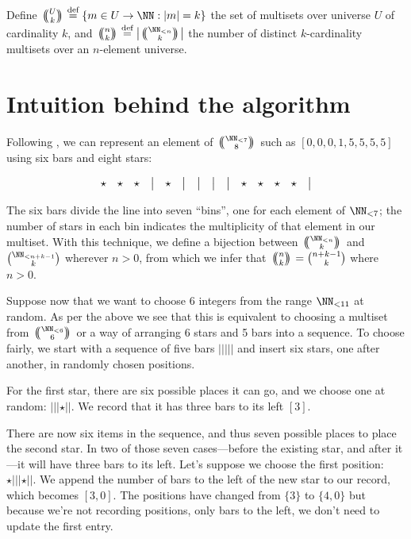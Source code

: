 \documentclass[letterpaper,luatex,11pt]{article}
\newcommand{\multichoose}[2]{
\left.\mathchoice
  {\left(\kern-0.48em\binom{#1}{#2}\kern-0.48em\right)}
  {\big(\kern-0.30em\binom{\smash{#1}}{\smash{#2}}\kern-0.30em\big)}
  {\left(\kern-0.30em\binom{\smash{#1}}{\smash{#2}}\kern-0.30em\right)}
  {\left(\kern-0.30em\binom{\smash{#1}}{\smash{#2}}\kern-0.30em\right)}
\right.}
\newcommand*{\defeq}{\stackrel{\text{def}}{=}}
\begin{document}
Define $\multichoose{U}{k} \defeq \{m \in U \rightarrow \NN: |m| =
k\}$ the set of multisets over universe \(U\) of cardinality \(k\),
and \(\multichoose{n}{k} \defeq
\left|\multichoose{\NN_{<n}}{k}\right|\) the number of distinct
\(k\)-cardinality multisets over an \(n\)-element universe.

\section{Intuition behind the algorithm}

Following \cite{feller}, we can represent an element of
\(\multichoose{\NN_{<7}}{8}\) such as \([0,0,0,1,5,5,5,5]\) using six
bars and eight stars:

\begin{displaymath}
    \begin{array}{ c c c c c c c c c c c c c c c }
        \star & \star & \star & \big| & \star & \big| & \big| & \big| & \big| & \star & \star & \star & \star & \big| \\
    \end{array}
\end{displaymath}

The six bars divide the line into seven ``bins'', one for each element
of \(\NN_{<7}\); the number of stars in each bin indicates the
multiplicity of that element in our multiset. With this technique, we
define a bijection between \(\multichoose{\NN_{<n}}{k}\) and
\(\binom{\NN_{<n + k - 1}}{k}\) wherever \(n > 0\), from which we
infer that \(\multichoose{n}{k} = \binom{n + k - 1}{k}\) where \(n >
0\).

Suppose now that we want to choose 6 integers from the range
$\NN_{<11}$ at random. As per the above we see that this is equivalent
to choosing a multiset from \(\multichoose{\NN_{<6}}{6}\) or a way of
arranging 6 stars and 5 bars into a sequence. To choose fairly, we
start with a sequence of five bars \(|||||\) and insert six stars, one
after another, in randomly chosen positions.

For the first star, there are six possible places it can go, and we
choose one at random: \(|||\star||\). We record that it has three bars
to its left \([3]\).

There are now six items in the sequence, and thus seven possible
places to place the second star. In two of those seven cases---before
the existing star, and after it---it will have three bars to its left.
Let's suppose we choose the first position: \(\star|||\star||\). We
append the number of bars to the left of the new star to our record,
which becomes \([3, 0]\). The positions have changed from \(\{3\}\) to
\(\{4, 0\}\) but because we're not recording positions, only bars to
the left, we don't need to update the first entry.
\end{document}
